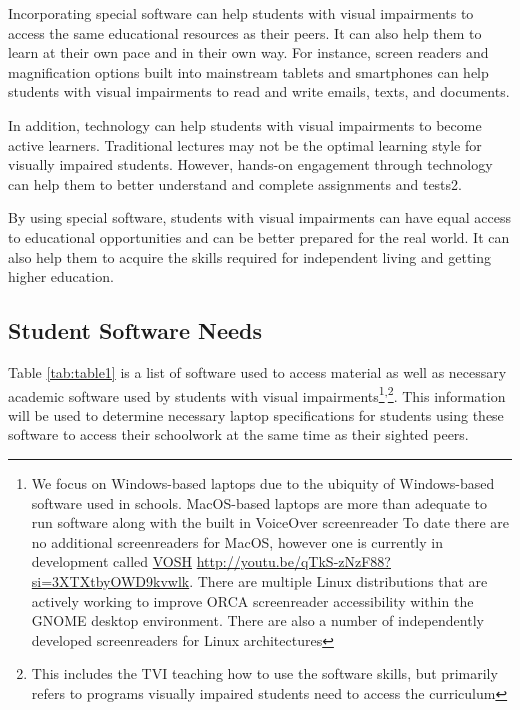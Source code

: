 \documentclass[12pt,letterpaper,twoside]{extreport}
\newcommand\fnsep{\textsuperscript{,}}
\begin{document}
Incorporating special software can help students with visual impairments to access the same educational resources as their peers. It can also help them to learn at their own pace and in their own way. For instance, screen readers and magnification options built into mainstream tablets and smartphones can help students with visual impairments to read and write emails, texts, and documents.

In addition, technology can help students with visual impairments to become active learners. Traditional lectures may not be the optimal learning style for visually impaired students. However, hands-on engagement through technology can help them to better understand and complete assignments and tests2.

By using special software, students with visual impairments can have equal access to educational opportunities and can be better prepared for the real world. It can also help them to acquire the skills required for independent living and getting higher education.

\pagebreak\hypertarget{student-software-needs}{}\subsection{Student Software Needs}\label{student-software-needs}
Table \ref{tab:table1} is a list of software used to access material as well as necessary academic software used by students with visual impairments\footnote{\raggedright We focus on Windows-based laptops due to the ubiquity of Windows-based software used in schools. MacOS-based laptops are more than adequate to run software along with the built in VoiceOver screenreader  To date there are no additional screenreaders for MacOS, however one is currently in development called \href{http://youtu.be/qTkS-zNzF88?si=3XTXtbyOWD9kvwlk}{VOSH} \url{http://youtu.be/qTkS-zNzF88?si=3XTXtbyOWD9kvwlk}. There are multiple Linux distributions that are actively working to improve ORCA screenreader accessibility within the GNOME desktop environment. There are also a number of independently developed screenreaders for Linux architectures}\fnsep\footnote{\raggedright This includes the TVI teaching how to use the software skills, but primarily refers to programs visually impaired students need to access the curriculum}. This information will be used to determine necessary laptop specifications for students using these software to access their schoolwork at the same time as their sighted peers.
\end{document}
